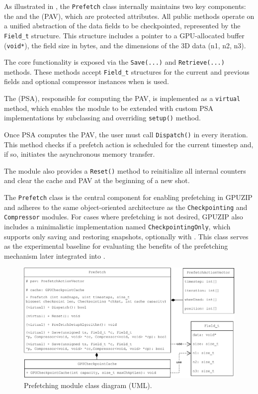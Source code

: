 \documentclass[Ingles]{ic-tese-v3}
\begin{document}
As illustrated in , the \texttt{Prefetch} class internally maintains two key components: the \cache and the \pav (PAV), which are protected attributes. All public methods operate on a unified abstraction of the data fields to be checkpointed, represented by the \texttt{Field\_t} structure. This structure includes a pointer to a GPU-allocated buffer (\texttt{void*}), the field size in bytes, and the dimensions of the 3D data (n1, n2, n3).

The core functionality is exposed via the \texttt{Save(...)} and \texttt{Retrieve(...)} methods. These methods accept \texttt{Field\_t} structures for the current and previous fields and optional compressor instances when \compression is used. 

The \psa (PSA), responsible for computing the PAV, is implemented as a \texttt{virtual} method, which enables the module to be extended with custom PSA implementations by subclassing and overriding \texttt{setup()} method.

Once PSA computes the PAV, the user must call \texttt{Dispatch()} in every iteration. This method checks if a prefetch action is scheduled for the current timestep and, if so, initiates the asynchronous memory transfer.

The module also provides a \texttt{Reset()} method to reinitialize all internal counters and clear the cache and PAV at the beginning of a new shot.

The \texttt{Prefetch} class is the central component for enabling prefetching in GPUZIP and adheres to the same object-oriented architecture as the \texttt{Checkpointing} and \texttt{Compressor} modules. For cases where prefetching is not desired, GPUZIP also includes a minimalistic implementation named \texttt{CheckpointingOnly}, which supports only saving and restoring snapshots, optionally with \compression. This class serves as the experimental baseline for evaluating the benefits of the prefetching mechanism later integrated into \awave.


\begin{figure}
  \centering
  \includegraphics[width=1\linewidth,trim={0 0 0 0},clip]{figures/oss/prefetch_uml.pdf}
  \caption[Prefetching module class diagram]{Prefetching module class diagram (UML).}
  \label{fig:prefetchuml}
\end{figure}
\end{document}
